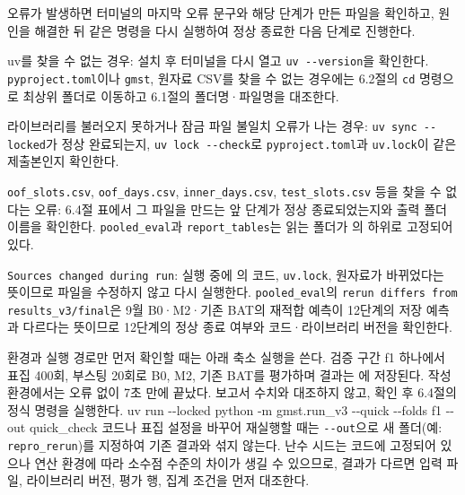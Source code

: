 
오류가 발생하면 터미널의 마지막 오류 문구와 해당 단계가 만든 파일을 확인하고, 원인을 해결한 뒤 같은 명령을 다시 실행하여 정상 종료한 다음 단계로 진행한다.
\begin{hwplist}
\item uv를 찾을 수 없는 경우: 설치 후 터미널을 다시 열고 \texttt{uv -{}-version}을 확인한다. \texttt{pyproject.toml}이나 \texttt{gmst}, 원자료 CSV를 찾을 수 없는 경우에는 6.2절의 \texttt{cd} 명령으로 최상위 폴더로 이동하고 6.1절의 폴더명·파일명을 대조한다.
\item 라이브러리를 불러오지 못하거나 잠금 파일 불일치 오류가 나는 경우: \texttt{uv sync -{}-locked}가 정상 완료되는지, \texttt{uv lock -{}-check}로 \texttt{pyproject.toml}과 \texttt{uv.lock}이 같은 제출본인지 확인한다.
\item \texttt{oof\_slots.csv}, \texttt{oof\_days.csv}, \texttt{inner\_days.csv}, \texttt{test\_slots.csv} 등을 찾을 수 없다는 오류: 6.4절 표에서 그 파일을 만드는 앞 단계가 정상 종료되었는지와 출력 폴더 이름을 확인한다. \texttt{pooled\_eval}과 \texttt{report\_tables}는 읽는 폴더가 의 하위로 고정되어 있다.
\item \texttt{Sources changed during run}: 실행 중에 의 코드, \texttt{uv.lock}, 원자료가 바뀌었다는 뜻이므로 파일을 수정하지 않고 다시 실행한다. \texttt{pooled\_eval}의 \texttt{rerun differs from results\_v3/final}은 9월 B0·M2·기존 BAT의 재적합 예측이 12단계의 저장 예측과 다르다는 뜻이므로 12단계의 정상 종료 여부와 코드·라이브러리 버전을 확인한다.
\end{hwplist}
환경과 실행 경로만 먼저 확인할 때는 아래 축소 실행을 쓴다. 검증 구간 f1 하나에서 표집 400회, 부스팅 20회로 B0, M2, 기존 BAT를 평가하며 결과는 에 저장된다. 작성 환경에서는 오류 없이 7초 만에 끝났다. 보고서 수치와 대조하지 않고, 확인 후 6.4절의 정식 명령을 실행한다.
\sixopen uv run -{}-locked python -m gmst.run\_v3 -{}-quick -{}-folds f1 -{}-out quick\_check\sixclose
코드나 표집 설정을 바꾸어 재실행할 때는 \texttt{-{}-out}으로 새 폴더(예: \texttt{repro\_rerun})를 지정하여 기존 결과와 섞지 않는다. 난수 시드는 코드에 고정되어 있으나 연산 환경에 따라 소수점 수준의 차이가 생길 수 있으므로, 결과가 다르면 입력 파일, 라이브러리 버전, 평가 행, 집계 조건을 먼저 대조한다.
\endgroup
